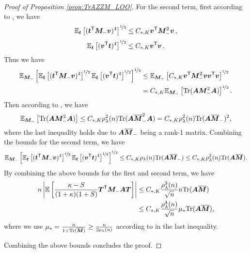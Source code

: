 \begin{proof}[Proof of Proposition \ref{prop:TrAZZM_LOO}]
For the second term, first according to \citet[Lemma 2]{misiakiewicz2024non}, we have
\[
\E_\bt \left[(\bt^\sT \bM_- \bv)^4\right]^{\nicefrac{1}{2}} \leq C_{*,K} \bv^\sT \bM_-^2 \bv \,,
\]
\[
\E_\bt \left[(\bv^\sT \bt)^4\right]^{\nicefrac{1}{2}} \leq C_{*,K} \bv^\sT \bv \,.
\]
Thus we have
\[
\begin{aligned}
\E_{\bM_-}\left[\E_{\bt}\left[(\bt^\sT \bM_- \bv)^{4}\right]^{\nicefrac{1}{2}} \E_\bt\left[(\bv^\sT \bt)^4\right]^{\nicefrac{1}{2}} \right]^{\nicefrac{1}{2}}
&\leq \E_{\bM_-}\left[C_{*,K} \bv^\sT \bM_-^2 \bv \bv^\sT \bv \right]^{\nicefrac{1}{2}}\\
&= C_{*,K} \E_{\bM_-}\left[\Tr(\bA\bM_-^2 \bA) \right]^{\nicefrac{1}{2}}.
\end{aligned}
\]
Then according to \citet[Lemma 4.(b)]{misiakiewicz2024non}, we have
\[
\E_{\bM_-}\left[\Tr(\bA\bM_-^2 \bA) \right] \leq C_{*,K}\rho^2_{\lambda}(n)\Tr(\bA \obM_-^2 \bA) = C_{*,K}\rho^2_{\lambda}(n)\Tr(\bA \obM_-)^2,
\]
where the last inequality holds due to $\bA\obM_-$ being a rank-1 matrix. Combining the bounds for the second term, we have
\[
\begin{aligned}
\E_{\bM_-}\left[\E_{\bt}\left[(\bt^\sT \bM_- \bv)^{4}\right]^{\nicefrac{1}{2}} \E_\bt\left[(\bv^\sT \bt)^4\right]^{\nicefrac{1}{2}} \right]^{\nicefrac{1}{2}} \leq  C_{*,K}\rho_{\lambda}(n)\Tr(\bA\obM_-) \leq C_{*,K}\rho_{\lambda}^2(n)\Tr(\bA\obM).
\end{aligned}
\]
By combining the above bounds for the first and second term, we have
\[
\begin{aligned}
n\left| \E\left[\frac{\kappa- S}{(1+\kappa)(1+S)}\bT^\sT \bM_- \bA \bT\right]\right| &\leq C_{*,K} \frac{ \rho_\lambda^3 (n) }{\sqrt{n}} n\Tr(\bA\obM)\\
&\leq C_{*,K} \frac{ \rho_\lambda^4 (n) }{\sqrt{n}} \mu_*\Tr(\bA\obM),
\end{aligned}
\]
where we use $\mu_* = \frac{n}{1+\Tr(\obM)} \geq \frac{n}{2\rho_\lambda(n)}$ according to \citet[Lemma 3]{misiakiewicz2024non} in the last inequality.

Combining the above bounds concludes the proof.
\end{proof}


